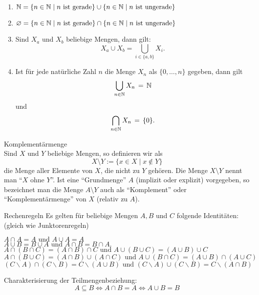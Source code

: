 \begin{example}
    \begin{enumerate}
        \item $\mathbb{N}=\{n\in \mathbb{N}\mid n\text{ ist gerade}\}\cup \{n\in \mathbb{N}\mid n\text{ ist ungerade}\}$
        \item $\varnothing=\{n\in \mathbb{N}\mid n\text{ ist gerade}\}\cap \{n\in \mathbb{N}\mid n\text{ ist ungerade}\}$
        \item Sind $X_a$ und $X_b$ beliebige Mengen, dann gilt:
            \[
                X_a\cup X_b=\bigcup_{i\in\{a,b\}}X_i.
            \]
        \item Ist für jede natürliche Zahl $n$ die Menge $X_n$ als $\{0,\dots, n\}$ gegeben, dann gilt
            \[
                \bigcup_{n\in \mathbb{N}}X_n\,=\,\mathbb{N}
            \]
            und
            \[
                \bigcap_{n\in \mathbb{N}}X_n\,=\,\{0\}.
            \]
    \end{enumerate}
\end{example}

\begin{definition}{Komplementärmenge}\\
    Sind $X$ und $Y$ beliebige Mengen, so definieren wir als
    \[
        X\setminus Y:=\{x\in X\mid x\notin Y\}
    \]
    die Menge aller Elemente von $X$, die nicht zu $Y$ gehören. Die Menge $X\setminus Y$ nennt man ``$X$ ohne $Y$''. Ist eine ``Grundmenge'' $A$ (implizit oder explizit) vorgegeben, so bezeichnet man die Menge $A\setminus Y$ auch als ``Komplement'' oder ``Komplementärmenge'' von $X$ (relativ zu $A$).
\end{definition}

\begin{lemma}{Rechenregeln}
    Es gelten für beliebige Mengen $A,B$ und $C$ folgende Identitäten: (gleich wie Junktorenregeln)
    \begin{center}
        $A\cap A=A\text{ und }A\cup A=A$\\
        $A\cup B=B\cup A\text{ und }A\cap B=B\cap A.$\\
        $A\cap(B\cap C)=(A\cap B)\cap C\text{ und }A\cup(B\cup C)=(A\cup B)\cup C$\\
        $A\cap(B\cup C)=(A\cap B)\cup (A\cap C)\text{ und }A\cup(B\cap C)=(A\cup B)\cap (A\cup C)$\\
        $(C\backslash A)\cap (C\backslash B)=C\backslash (A\cup B)\text{ und }(C\backslash A)\cup (C\backslash B)=C\backslash (A\cap B)$
    \end{center}
    Charakterisierung der Teilmengenbeziehung:
    \[
        A\subseteq B\Leftrightarrow A\cap B= A\Leftrightarrow A\cup B=B
    \]
\end{lemma}

